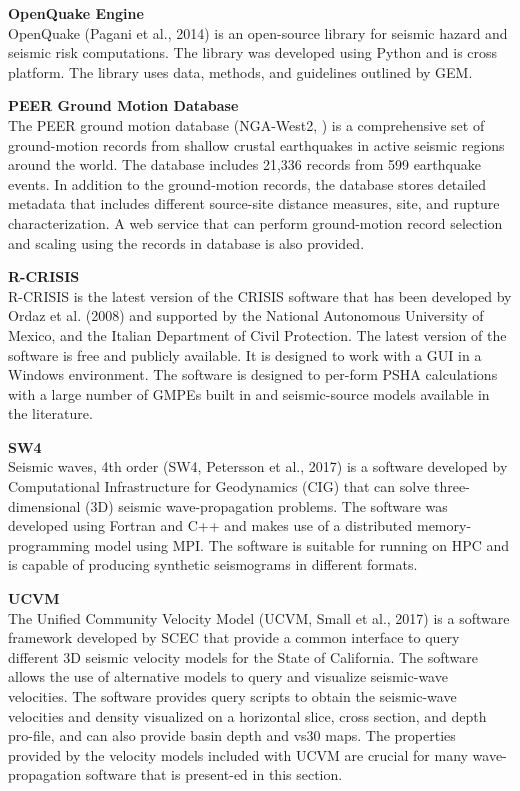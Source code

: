 \noindent\textbf{OpenQuake Engine} \\OpenQuake (Pagani et al., 2014) is an open-source library for seismic hazard and seismic risk computations. The library was developed using Python and is cross platform. The library uses data, methods, and guidelines outlined by GEM.
\newline

\noindent\textbf{PEER Ground Motion Database} \\The PEER ground motion database (NGA-West2, \cite{ancheta2014ngawest2}) is a comprehensive set of ground-motion records from shallow crustal earthquakes in active seismic regions around the world. The database includes 21,336 records from 599 earthquake events. In addition to the ground-motion records, the database stores detailed metadata that includes different source-site distance measures, site, and rupture characterization. A web service that can perform ground-motion record selection and scaling using the records in database is also provided.
\newline

\noindent\textbf{R-CRISIS } \\R-CRISIS is the latest version of the CRISIS software that has been developed by Ordaz et al. (2008) and supported by the National Autonomous University of Mexico, and the Italian Department of Civil Protection. The latest version of the software is free and publicly available. It is designed to work with a GUI in a Windows environment. The software is designed to per-form PSHA calculations with a large number of GMPEs built in and seismic-source models available in the literature.
\newline

\noindent\textbf{SW4} \\Seismic waves, 4th order (SW4, Petersson et al., 2017) is a software developed by Computational Infrastructure for Geodynamics (CIG) that can solve three-dimensional (3D) seismic wave-propagation problems. The software was developed using Fortran and C++ and makes use of a distributed memory-programming model using MPI. The software is suitable for running on HPC and is capable of producing synthetic seismograms in different formats.
\newline

\noindent\textbf{UCVM} \\The Unified Community Velocity Model (UCVM, Small et al., 2017) is a software framework developed by SCEC that provide a common interface to query different 3D seismic velocity models for the State of California. The software allows the use of alternative models to query and visualize seismic-wave velocities. The software provides query scripts to obtain the seismic-wave velocities and density visualized on a horizontal slice, cross section, and depth pro-file, and can also provide basin depth and vs30 maps. The properties provided by the velocity models included with UCVM are crucial for many wave-propagation software that is present-ed in this section.
\newline

